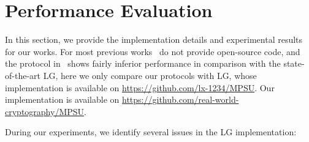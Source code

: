 \section{Performance Evaluation}

In this section, we provide the implementation details and experimental results for our works. For most previous works~\cite{KS-CRYPTO-2005,Frikken-ACNS-2007,BA-ASIACCS-2012,GNT-eprint-2023} do not provide open-source code, and the protocol in~\cite{VCE22} shows fairly inferior performance in comparison with the state-of-the-art LG, here we only compare our protocols with LG, whose implementation is available on \url{https://github.com/lx-1234/MPSU}. Our implementation is available on \url{https://github.com/real-world-cryptography/MPSU}.

During our experiments, we identify several issues in the LG implementation: 
